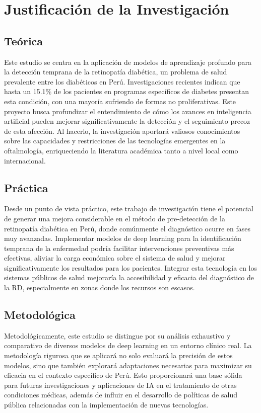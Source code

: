 \section{Justificación de la Investigación}

\subsection{Teórica}
Este estudio se centra en la aplicación de modelos de aprendizaje profundo para la detección temprana de la retinopatía diabética, un problema de salud prevalente entre los diabéticos en Perú. Investigaciones recientes indican que hasta un 15.1\% de los pacientes en programas específicos de diabetes presentan esta condición, con una mayoría sufriendo de formas no proliferativas. Este proyecto busca profundizar el entendimiento de cómo los avances en inteligencia artificial pueden mejorar significativamente la detección y el seguimiento precoz de esta afección. Al hacerlo, la investigación aportará valiosos conocimientos sobre las capacidades y restricciones de las tecnologías emergentes en la oftalmología, enriqueciendo la literatura académica tanto a nivel local como internacional.

\subsection{Práctica}
Desde un punto de vista práctico, este trabajo de investigación tiene el potencial de generar una mejora considerable en el método de pre-detección de la retinopatía diabética en Perú, donde comúnmente el diagnóstico ocurre en fases muy avanzadas. Implementar modelos de deep learning para la identificación temprana de la enfermedad podría facilitar intervenciones preventivas más efectivas, aliviar la carga económica sobre el sistema de salud y mejorar significativamente los resultados para los pacientes. Integrar esta tecnología en los sistemas públicos de salud mejoraría la accesibilidad y eficacia del diagnóstico de la RD, especialmente en zonas donde los recursos son escasos.

\subsection{Metodológica}
Metodológicamente, este estudio se distingue por su análisis exhaustivo y comparativo de diversos modelos de deep learning en un entorno clínico real. La metodología rigurosa que se aplicará no solo evaluará la precisión de estos modelos, sino que también explorará adaptaciones necesarias para maximizar su eficacia en el contexto específico de Perú. Esto proporcionará una base sólida para futuras investigaciones y aplicaciones de IA en el tratamiento de otras condiciones médicas, además de influir en el desarrollo de políticas de salud pública relacionadas con la implementación de nuevas tecnologías.

